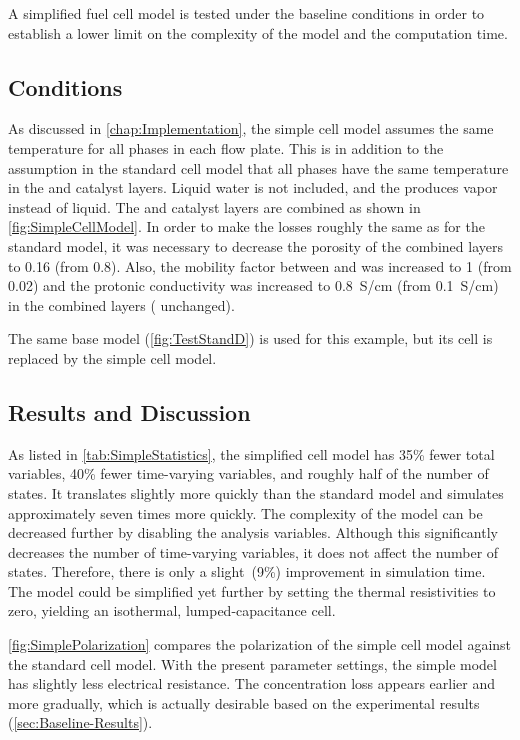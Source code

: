 A simplified fuel cell model is tested under the baseline conditions in order to establish a lower limit on the complexity of the model and the computation time.  

\subsection{Conditions}

As discussed in \autoref{chap:Implementation}, the simple cell model assumes the same temperature for all phases in each flow plate.  This is in addition to the assumption in the standard cell model that all phases have the same temperature in the  and catalyst layers.  Liquid water is not included, and the  produces vapor instead of liquid.  The  and catalyst layers are combined as shown in \autoref{fig:SimpleCellModel}.  In order to make the losses roughly the same as for the standard model, it was necessary to decrease the porosity of the combined layers to 0.16 (from 0.8).  Also, the mobility factor between  and  was increased to 1 (from 0.02) and the protonic conductivity was increased to \SI{0.8}{S/cm} (from \SI{0.1}{S/cm}) in the combined layers ( unchanged).

The same base  model (\autoref{fig:TestStandD}) is used for this example, but its cell is replaced by the simple cell model.

\subsection{Results and Discussion}



As listed in \autoref{tab:SimpleStatistics}, the simplified cell model has 35\% fewer total variables, 40\% fewer time-varying variables, and roughly half of the number of states.  It translates slightly more quickly than the standard model and simulates approximately seven times more quickly.  The complexity of the model can be decreased further by disabling the analysis variables.  Although this significantly decreases the number of time-varying variables, it does not affect the number of states.  Therefore, there is only a slight~(9\%) improvement in simulation time.  The model could be simplified yet further by setting the thermal resistivities to zero, yielding an isothermal, lumped-capacitance cell.

\autoref{fig:SimplePolarization} compares the polarization of the simple cell model against the standard cell model.  With the present parameter settings, the simple model has slightly less electrical resistance.  The concentration loss appears earlier and more gradually, which is actually desirable based on the experimental results (\autoref{sec:Baseline-Results}).

